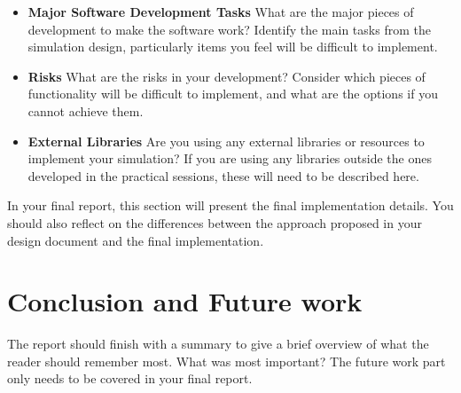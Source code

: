 \documentclass[conference,backref=page]{acmsiggraph}
\begin{document}
\begin{itemize}
\item  {\bf Major Software Development Tasks} What are the major pieces of development to make the software work?  Identify the main tasks from the simulation design, particularly items you feel will be difficult to implement. 
\item {\bf Risks} What are the risks in your development?  Consider which pieces of functionality will be difficult to implement, and what are the options if you cannot achieve them.
\item {\bf External Libraries} Are you using any external libraries or resources to implement your simulation?  If you are using any libraries outside the ones developed in the practical sessions, these will need to be described here.
\end{itemize}

In your final report, this section will present the final implementation details. You should also reflect on the differences between the approach proposed in your design document and the final implementation.

\section{Conclusion and Future work}
The report should finish with a summary to give a brief overview of what the reader should remember most.  What was most important? The future work part only needs to be covered in your final report.






\end{document}
